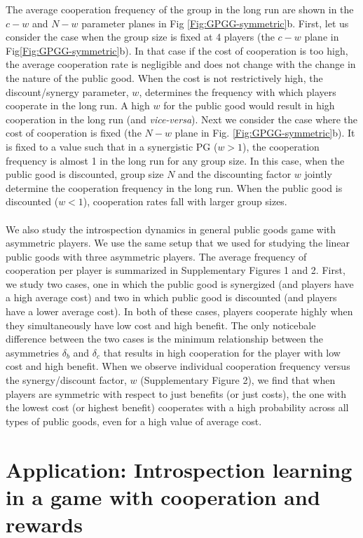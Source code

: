 \documentclass[11pt]{article}
\theoremstyle{plainCl1}
\theoremstyle{plainCl2}
\begin{document}
\noindent The average cooperation frequency of the group in the long run are shown in the $c-w$ and $N-w$ parameter planes in Fig \ref{Fig:GPGG-symmetric}b. First, let us consider the case when the group size is fixed at 4 players (the $c-w$ plane in Fig\ref{Fig:GPGG-symmetric}b). In that case if the cost of cooperation is too high, the average cooperation rate is negligible and does not change with the change in the nature of the public good. When the cost is not restrictively high, the discount/synergy parameter, $w$, determines the frequency with which players cooperate in the long run. A high $w$ for the public good would result in high cooperation in the long run (and \emph{vice-versa}). Next we consider the case where the cost of cooperation is fixed (the $N-w$ plane in Fig. \ref{Fig:GPGG-symmetric}b). It is fixed to a value such that in a synergistic PG ($w > 1$), the cooperation frequency is almost 1 in the long run for any group size. In this case, when the public good is discounted, group size $N$ and the discounting factor $w$ jointly determine the cooperation frequency in the long run. When the public good is discounted ($w < 1$), cooperation rates fall with larger group sizes.\\ \\
\noindent 
We also study the introspection dynamics in general public goods game with asymmetric players. We use the same setup that we used for studying the linear public goods with three asymmetric players. The average frequency of cooperation per player is summarized in Supplementary Figures 1 and 2. First, we study two cases, one in which the public good is synergized (and players have a high average cost) and two in which public good is discounted (and players have a lower average cost). In both of these cases, players cooperate highly when they simultaneously have low cost and high benefit. The only noticebale difference between the two cases is the minimum relationship between the asymmetries $\delta_b$ and $\delta_c$ that results in high cooperation for the player with low cost and high benefit. When we observe individual cooperation frequency versus the synergy/discount factor, $w$ (Supplementary Figure 2), we find that when players are symmetric with respect to just benefits (or just costs), the one with the lowest cost (or highest benefit) cooperates with a high probability across all types of public goods, even for a high value of average cost.

\section*{Application: Introspection learning in a game with cooperation and rewards}
\end{document}
